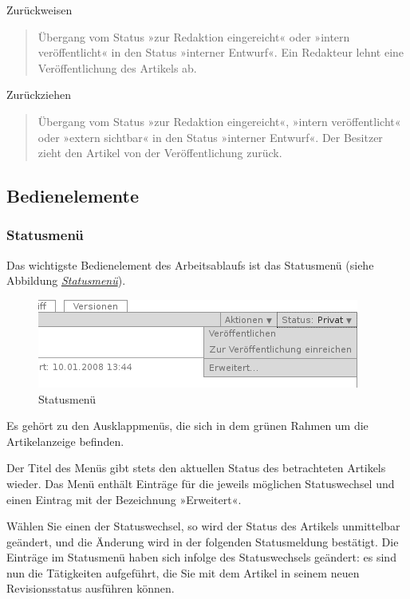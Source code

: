 \documentclass[a4paper,12pt,ngerman]{manual}
\begin{document}
Zurückweisen
\begin{quote}

Übergang vom Status »zur Redaktion eingereicht« oder
»intern veröffentlicht« in den Status »interner Entwurf«. Ein Redakteur
lehnt eine Veröffentlichung des Artikels ab.
\end{quote}

Zurückziehen
\begin{quote}

Übergang vom Status »zur Redaktion eingereicht«, »intern
veröffentlicht« oder »extern sichtbar« in den Status »interner
Entwurf«. Der Besitzer zieht den Artikel von der Veröffentlichung
zurück.
\end{quote}
\hypertarget{sec-bedienelemente}{}

\subsection{Bedienelemente}


\subsubsection{Statusmenü}

Das wichtigste Bedienelement des Arbeitsablaufs
ist das Statusmenü (siehe Abbildung \hyperlink{fig-workflow}{\emph{Statusmenü}}).
\hypertarget{fig-workflow}{}\begin{figure}[htbp]
\centering

\includegraphics{workflow.png}
\caption{Statusmenü}\end{figure}

Es gehört zu den Ausklappmenüs, die sich in dem grünen Rahmen um die
Artikelanzeige befinden.

Der Titel des Menüs gibt stets den aktuellen Status des betrachteten Artikels
wieder. Das Menü enthält Einträge für die jeweils möglichen Statuswechsel und
einen Eintrag mit der Bezeichnung »Erweitert«.

Wählen Sie einen der Statuswechsel, so wird der Status des Artikels
unmittelbar geändert, und die Änderung wird in der folgenden Statusmeldung
bestätigt. Die Einträge im Statusmenü haben sich infolge des Statuswechsels
geändert: es sind nun die Tätigkeiten aufgeführt, die Sie mit dem Artikel in
seinem neuen Revisionsstatus ausführen können.
\end{document}
